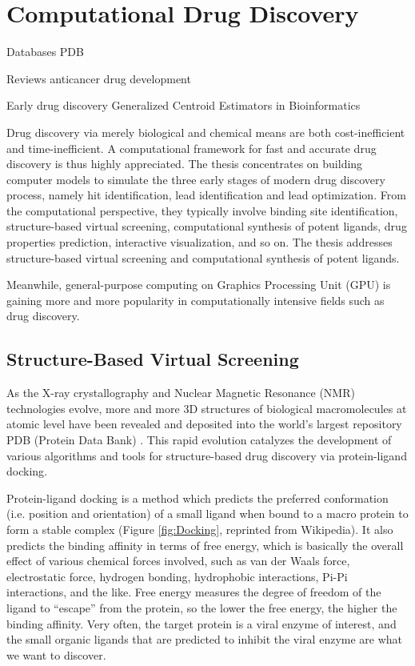 \chapter{Computational Drug Discovery}

Databases
  PDB \citep{105}

Reviews
  anticancer drug development \citep{254}

Early drug discovery
  Generalized Centroid Estimators in Bioinformatics \citep{272}

Drug discovery via merely biological and chemical means are both cost-inefficient and time-inefficient. A computational framework for fast and accurate drug discovery is thus highly appreciated. The thesis concentrates on building computer models to simulate the three early stages of modern drug discovery process, namely hit identification, lead identification and lead optimization. From the computational perspective, they typically involve binding site identification, structure-based virtual screening, computational synthesis of potent ligands, drug properties prediction, interactive visualization, and so on. The thesis addresses structure-based virtual screening and computational synthesis of potent ligands.

Meanwhile, general-purpose computing on Graphics Processing Unit (GPU) is gaining more and more popularity in computationally intensive fields such as drug discovery.

\section{Structure-Based Virtual Screening}

As the X-ray crystallography and Nuclear Magnetic Resonance (NMR) technologies evolve, more and more 3D structures of biological macromolecules at atomic level have been revealed and deposited into the world's largest repository PDB (Protein Data Bank) \citep{540,539,537,105,538}. This rapid evolution catalyzes the development of various algorithms and tools for structure-based drug discovery via protein-ligand docking.

Protein-ligand docking is a method which predicts the preferred conformation (i.e. position and orientation) of a small ligand when bound to a macro protein to form a stable complex (Figure \ref{fig:Docking}, reprinted from Wikipedia). It also predicts the binding affinity in terms of free energy, which is basically the overall effect of various chemical forces involved, such as van der Waals force, electrostatic force, hydrogen bonding, hydrophobic interactions, Pi-Pi interactions, and the like. Free energy measures the degree of freedom of the ligand to ``escape'' from the protein, so the lower the free energy, the higher the binding affinity. Very often, the target protein is a viral enzyme of interest, and the small organic ligands that are predicted to inhibit the viral enzyme are what we want to discover.

